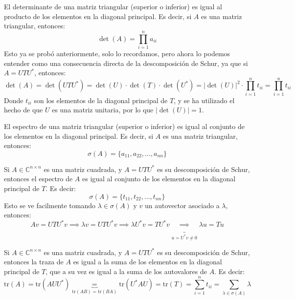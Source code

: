 \begin{corolario}
    El determinante de una matriz triangular (superior o inferior) es igual al producto de los elementos en la diagonal principal. Es decir, si $ A $ es una matriz triangular, entonces:
    \[
        \det(A) = \prod_{i=1}^{n} a_{ii}
    \]
    Esto ya se probó anteriormente, solo lo recordamos, pero ahora lo podemos entender como una consecuencia directa de la descomposición de Schur, ya que si $ A = UTU^* $, entonces:
    \[
        \det(A) = \det(UTU^*) =
        \det(U) \cdot \det(T) \cdot \det(U^*) =
        |\det(U)|^2 \cdot \prod_{i=1}^{n} t_{ii} =
        \prod_{i=1}^{n} t_{ii}
    \]
    Donde $ t_{ii} $ son los elementos de la diagonal principal de $ T $, y se ha utilizado el hecho de que $ U $ es una matriz unitaria, por lo que $ |\det(U)| = 1 $.
\end{corolario}

\begin{corolario}
    El espectro de una matriz triangular (superior o inferior) es igual al conjunto de los elementos en la diagonal principal. Es decir, si $ A $ es una matriz triangular, entonces:
    \[
        \sigma(A) = \{ a_{11}, a_{22}, \dots, a_{nn} \}
    \]
\end{corolario}

\begin{corolario}
    Si $ A \in \mathbb{C}^{n \times n} $ es una matriz cuadrada, y $ A = UTU^* $ es su descomposición de Schur, entonces el espectro de $ A $ es igual al conjunto de los elementos en la diagonal principal de $ T $. Es decir:
    \[
        \sigma(A) = \{ t_{11}, t_{22}, \dots, t_{nn} \}
    \]
    Esto se ve facilmente tomando $\lambda \in \sigma(A)$ y $v$ un autovector asociado a $\lambda$, entonces:
    \[
        Av =
        UTU^* v \implies
        \lambda v =
        UTU^* v \implies
        \lambda U^* v =
        TU^* v \underbrace{\implies}_{u = U^* v \neq 0}
        \lambda u =
        Tu
    \]
\end{corolario}

\begin{corolario}
    Si $ A \in \mathbb{C}^{n \times n} $ es una matriz cuadrada, y $ A = UTU^* $ es su descomposición de Schur, entonces la traza de $ A $ es igual a la suma de los elementos en la diagonal principal de $ T $, que a su vez es igual a la suma de los autovalores de $ A $. Es decir:
    \[
        \text{tr}(A) =
        \text{tr}(AUU^*) \underbrace{=}_{\text{tr}(AB) = \text{tr}(BA)}
        \text{tr}(U^*AU) =
        \text{tr}(T) =
        \sum_{i=1}^{n} t_{ii} =
        \sum_{\lambda \in \sigma(A)} \lambda
    \]
\end{corolario}

